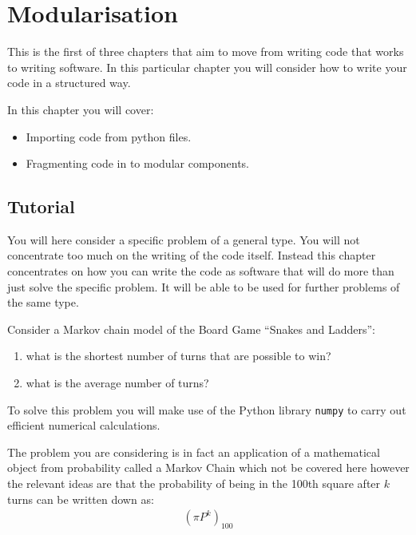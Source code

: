 \chapter{Modularisation}
\label{chp:modularisation}

This is the first of three chapters that aim to move from writing code
that works to writing software. In this particular chapter you will consider how
to write your code in a structured way.

In this chapter you will cover:
\begin{itemize}
    \item Importing code from python files.
    \item Fragmenting code in to modular components.
\end{itemize}


\section{Tutorial}
\label{sec:modularisation_tutorial}

You will here consider a specific problem of a general type. You will not
concentrate too much on the writing of the code itself. Instead this chapter
concentrates
on how you can write the code as software that will do more than just solve the
specific problem. It will be able to be used for further problems of the same
type.

Consider a Markov chain model of the Board Game ``Snakes and Ladders'':
\begin{enumerate}

\item 

what is the shortest number of turns that are possible to win?

\item 

what is the average number of turns?

\end{enumerate}



To solve this problem you will make use of the Python library \texttt{numpy}
to carry out efficient
numerical calculations.


The problem you are considering is in fact an application of a mathematical
object from probability called a Markov Chain which not be covered here 
however the relevant ideas are that the probability of being in the
100th square after \(k\) turns can be written down as:
\begin{equation*}
\begin{split}
    (\pi P ^ k)_{100}
\end{split}
\end{equation*}

